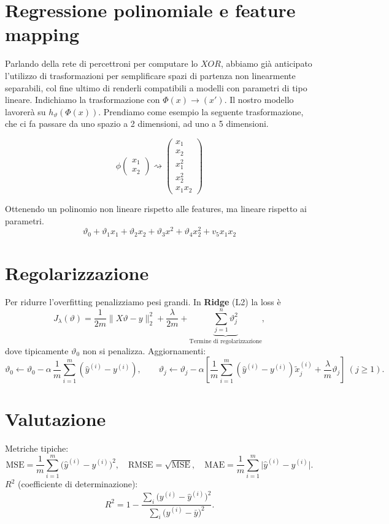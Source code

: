 \newpage

\section{Regressione polinomiale e feature mapping}
Parlando della rete di percettroni per computare lo $XOR$, abbiamo già anticipato l'utilizzo di trasformazioni per semplificare spazi di partenza non linearmente separabili, col fine ultimo di renderli compatibili a modelli con parametri di tipo lineare. Indichiamo la trasformazione con $\Phi(x) \to (x')$. Il nostro modello lavorerà su $h_\vartheta(\Phi(x))$. Prendiamo come esempio la seguente trasformazione, che ci fa passare da uno spazio a 2 dimensioni, ad uno a 5 dimensioni.

$$
\phi \begin{pmatrix}
	x_1\\
	x_2
\end{pmatrix} \rightsquigarrow \begin{pmatrix}
	x_1\\
	x_2\\
	x_1^2\\
	x_2^2\\
	x_1 x_2
\end{pmatrix}
$$

Ottenendo un polinomio non lineare rispetto alle features, ma lineare rispetto ai parametri.
$$
\vartheta_0 + \vartheta_{1}x_1 + \vartheta_{2}x_2 + \vartheta_{3}x^2 + \vartheta_{4}x_2^2 + v_5x_1x_2
$$

\section{Regolarizzazione}
Per ridurre l’overfitting penalizziamo pesi grandi. In \textbf{Ridge} (L2) la loss è
\[
J_\lambda(\vartheta)=\frac{1}{2m}\|X\vartheta-y\|_2^2+\frac{\lambda}{2m} + \underbrace{\sum_{j=1}^{n}\vartheta_j^2}_{\text{Termine di regolarizzazione}},
\]
dove tipicamente \(\vartheta_0\) non si penalizza. Aggiornamenti:
\[
\vartheta_0\leftarrow \vartheta_0-\alpha\,\frac{1}{m}\sum_{i=1}^m(\hat y^{(i)}-y^{(i)}),\qquad
\vartheta_j\leftarrow \vartheta_j-\alpha\left[\frac{1}{m}\sum_{i=1}^m(\hat y^{(i)}-y^{(i)})\tilde x^{(i)}_j+\frac{\lambda}{m}\vartheta_j\right]\ (j\ge 1).
\]


\section{Valutazione}
Metriche tipiche:
\[
\text{MSE}=\frac{1}{m}\sum_{i=1}^m\!\big(\hat y^{(i)}-y^{(i)}\big)^2,\quad
\text{RMSE}=\sqrt{\text{MSE}},\quad
\text{MAE}=\frac{1}{m}\sum_{i=1}^m\!\lvert \hat y^{(i)}-y^{(i)}\rvert.
\]
\noindent
\textbf{\(R^2\)} (coefficiente di determinazione):
\[
R^2=1-\frac{\sum_i\big(y^{(i)}-\hat{y}^{(i)}\big)^2}{\sum_i\big(y^{(i)}-\bar{y}\big)^2}.
\]

